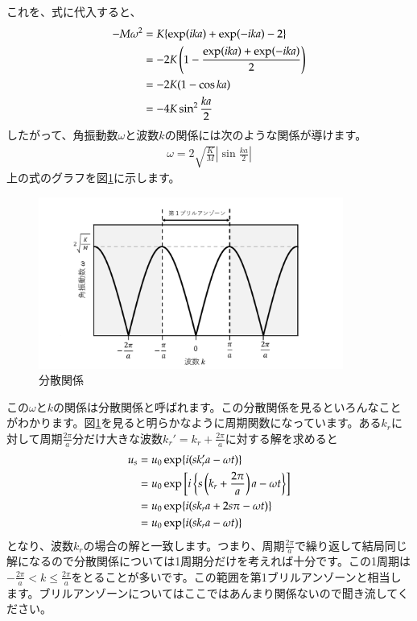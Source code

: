 \documentclass[10pt,b5paper,papersize,dvipdfmx]{jsbook}
\begin{document}
これを、式に代入すると、
\begin{align}
  -M\omega^2 &= K\{\exp(ika) + \exp(-ika) - 2\} \notag\\
             &= -2K\left(1-\frac{\exp(ika) + \exp(-ika)}{2}\right) \notag\\
             &= -2K(1-\cos ka) \notag\\
             &= -4K\sin^2\frac{ka}{2}
\end{align}
したがって、角振動数$\omega$と波数$k$の関係には次のような関係が導けます。
\begin{align}
  \omega = 2 \sqrt{\frac{K}{M}} \left| \sin \frac{ka}{2}\right|
\end{align}
上の式のグラフを図\ref{fig:bunnsan}に示します。
\begin{figure}[htbp]
  \centering
  \includegraphics[width=10cm]{img/bunsann.pdf}  %
  \caption{分散関係}
  \label{fig:bunnsan}
\end{figure}
この$\omega$と$k$の関係は分散関係と呼ばれます。この分散関係を見るといろんなことがわかります。図\ref{fig:bunnsan}を見ると明らかなように周期関数になっています。ある$k_r$に対して周期$\frac{2\pi}{a}$分だけ大きな波数$k_r' = k_r + \frac{2\pi}{a}$に対する解を求めると
\begin{align}
  u_s &= u_0 \exp\{i(sk_r'a - \omega t)\} \notag\\
      &= u_0 \exp \left[i\left\{s \left(k_r + \frac{2\pi}{a}\right)a-\omega t\right\}\right] \notag\\
      & = u_0 \exp {i(sk_ra + 2s\pi - \omega t)} \notag\\
      & = u_0 \exp {i(sk_ra -\omega t)}
\end{align}
となり、波数$k_r$の場合の解と一致します。つまり、周期$\frac{2\pi}{a}$で繰り返して結局同じ解になるので分散関係については1周期分だけを考えれば十分です。この1周期は$-\frac{2\pi}{a} < k\leq \frac{2\pi}{a}$をとることが多いです。この範囲を第1ブリルアンゾーンと相当します。ブリルアンゾーンについてはここではあんまり関係ないので聞き流してください。\par
\end{document}
